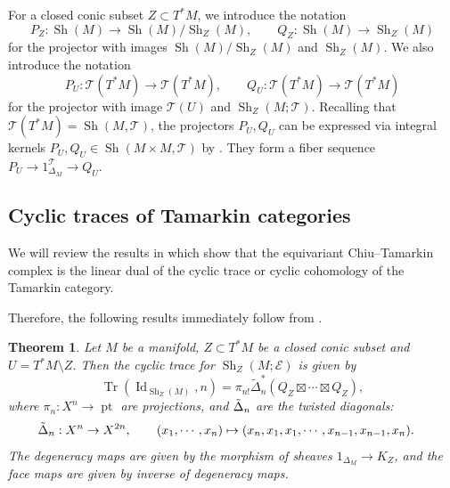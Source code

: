 \documentclass[11pt]{amsart}
\numberwithin{equation}{section}
\theoremstyle{plain}
\newtheorem{Thm}{Theorem}[section]
\theoremstyle{definition}
\theoremstyle{remark}
\newcommand{\cE} { {\mathcal{E}}}
\newcommand{\sT} { {\mathscr{T}}}
\newcommand{\pt}{{\operatorname{pt}}}
\newcommand{\Id}{{\operatorname{Id}}}
\newcommand{\Sh} { {\operatorname{Sh}}}
\newcommand\Tr{\operatorname{Tr}}
\begin{document}
For a closed conic subset $Z \subset T^*M$, we introduce the notation
\[P_Z: \Sh(M) \to \Sh(M)/\Sh_Z(M), \qquad Q_Z: \Sh(M) \to \Sh_Z(M)\]
for the projector with images $\Sh(M)/\Sh_Z(M)$ and $\Sh_Z(M)$.
We also introduce the notation 
\[P_U : \sT(T^*M) \to \sT(T^*M),\qquad Q_U: \sT(T^*M) \to \sT(T^*M) \]
for the projector with image $\sT(U)$ and $\Sh_Z(M;\sT)$. 
Recalling that 
$\sT(T^*M) = \Sh(M, \sT)$, the projectors
$P_U,Q_U$ can be expressed via 
integral kernels $P_U,Q_U \in \Sh(M \times M, \sT)$ by \cite[Proposition 5.16]{Hochschild-Kuo-Shende-Zhang}. They form a fiber sequence 
$P_U \to 1_{\Delta_{M}}^\sT \to Q_U .$





\subsection{Cyclic traces of Tamarkin categories}\label{sec:Tamarkin trace}
We will review the results in \cite[Section 4.1 \& 5.3]{Li-Zhang26-1} which show that the equivariant Chiu--Tamarkin complex is the linear dual of the cyclic trace or cyclic cohomology of the Tamarkin category.

Therefore, the following results immediately follow from \cite[Theorem 1.1 \& 1.5]{Li-Zhang26-1}.

\begin{Thm}\label{thm:S1-action-sheaf}
Let $M$ be a manifold, $Z \subset T^*M$ be a closed conic subset and $U = T^*M \setminus Z$. Then the cyclic trace for $\Sh_Z(M; \cE)$ is given by
\[\Tr(\Id_{\Sh_Z(M)}, n)=\pi_{n!}\widetilde{\Delta}_n^* (Q_{Z}\boxtimes \cdots\boxtimes Q_{Z}), \]
where $\pi_{n} : X^n  \rightarrow \pt$ are projections, and $\Tilde{\Delta}_n$ are the twisted diagonals:
\begin{align*}
    \Tilde{\Delta}_n&: X^n \rightarrow X^{2n}, \qquad (x_1,\cdots,x_n)\mapsto (x_n,x_1,x_1,\cdots,x_{n-1},x_{n-1},x_n).
\end{align*}
The degeneracy maps are given by the morphism of sheaves $1_{\Delta_{M}} \to K_Z$, and the face maps are given by inverse of degeneracy maps.
\end{Thm}
\end{document}
